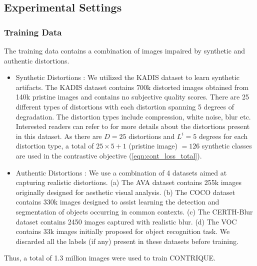 \documentclass[journal]{IEEEtran}
\begin{document}
\subsection{Experimental Settings}
\subsubsection*{\textbf{Training Data}}
The training data contains a combination of images impaired by synthetic and authentic distortions.
\begin{itemize}
    \item Synthetic Distortions : We utilized the KADIS dataset \cite{lin2020deepfl} to learn synthetic artifacts. The KADIS dataset contains 700k distorted images obtained from 140k pristine images and contains no subjective quality scores. There are 25 different types of distortions with each distortion spanning 5 degrees of degradation. The distortion types include compression, white noise, blur etc. Interested readers can refer to \cite{lin2020deepfl} for more details about the distortions present in this dataset. As there are $D=25$ distortions and $L^i=5$ degrees for each distortion type, a total of $25 \times 5 + 1$ (pristine image) $ = 126$ synthetic classes are used in the contrastive objective (\ref{eqn:cont_loss_total}).
    \item Authentic Distortions : We use a combination of 4 datasets aimed at capturing realistic distortions. (a) The AVA dataset \cite{murray2012ava} contains 255k images originally designed for aesthetic visual analysis. (b) The COCO dataset \cite{lin2014microsoft} contains 330k images designed to assist learning the detection and segmentation of objects occurring in common contexts. (c) The CERTH-Blur dataset \cite{mavridaki2014no} contains 2450 images captured with realistic blur. (d) The VOC \cite{everingham2010pascal} contains 33k images initially proposed for object recognition task. We discarded all the labels (if any) present in these datasets before training. 
\end{itemize}
Thus, a total of 1.3 million images were used to train CONTRIQUE.\\
\end{document}
